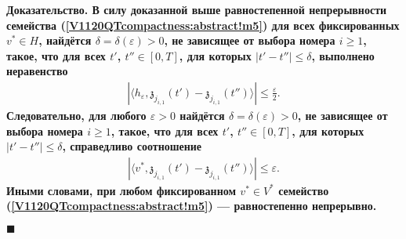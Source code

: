 \documentclass{report}
\newenvironment{Proof}{\par\noindent\bf Доказательство.\rm}{ $\blacksquare$\par}
\begin{document}
\begin{Proof}
В силу доказанной выше равностепенной непрерывности семейства (\ref{V1120QTcompactness:abstract!m5}) для всех фиксированных $v^*\in H$, найдётся $\delta=\delta(\varepsilon)>0$, не зависящее
от выбора номера $i\geqslant1$, такое, что для всех  $t'$, $t''\in[0,T]$, для которых $|t'-t''|\leqslant\delta$, выполнено неравенство
\begin{gather*}
|\langle h_\varepsilon,\mathfrak{z}_{j_{i,1}}(t')-\mathfrak{z}_{j_{i,1}}(t'')\rangle|\leqslant\frac\varepsilon2.
\end{gather*}
Следовательно, для любого $\varepsilon>0$ найдётся $\delta=\delta(\varepsilon)>0$, не зависящее от выбора номера $i\geqslant1$, такое, что
для всех  $t'$, $t''\in[0,T]$, для которых $|t'-t''|\leqslant\delta$, справедливо соотношение
\begin{gather*}
|\langle v^*,\mathfrak{z}_{j_{i,1}}(t')-\mathfrak{z}_{j_{i,1}}(t'')\rangle|\leqslant\varepsilon.
\end{gather*}
Иными словами, при любом фиксированном $v^*\in V^*$ семейство (\ref{V1120QTcompactness:abstract!m5}) --- равностепенно непрерывно.


\end{Proof}
\end{document}
